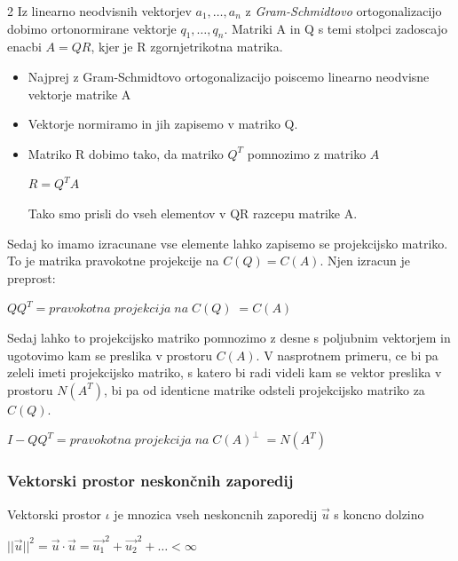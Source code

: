 \documentclass{article}
\begin{document}
\begin{multicols}{2}
	Iz linearno neodvisnih vektorjev $a_{1}, \dots, a_{n}$ z \textit{Gram-Schmidtovo} ortogonalizacijo
	dobimo ortonormirane vektorje $q_{1}, \dots, q_{n}$. Matriki A in Q s temi stolpci zadoscajo enacbi $A = QR$, kjer
	je R zgornjetrikotna matrika.
	\begin{itemize}
		\item Najprej z Gram-Schmidtovo ortogonalizacijo poiscemo linearno neodvisne vektorje matrike A
		\item Vektorje normiramo in jih zapisemo v matriko Q.
		\item Matriko R dobimo tako, da matriko $Q^{T}$ pomnozimo z matriko $A$
		      \begin{center}
			      \begin{math}
				      R = Q^{T}A
			      \end{math}
		      \end{center}
		      Tako smo prisli do vseh elementov v QR razcepu matrike A.
	\end{itemize}
	Sedaj ko imamo izracunane vse elemente lahko zapisemo se projekcijsko matriko. To je matrika pravokotne projekcije na $C(Q) = C(A)$.
	Njen izracun je preprost:
	\begin{center}
		\begin{math}
			QQ^{T} = pravokotna\; projekcija\; na\; C(Q)\; = C(A)
		\end{math}
	\end{center}
	Sedaj lahko to projekcijsko matriko pomnozimo z desne s poljubnim vektorjem in ugotovimo kam se preslika v prostoru $C(A)$.
	V nasprotnem primeru, ce bi pa zeleli imeti projekcijsko matriko, s katero bi radi videli kam se vektor preslika v prostoru $N(A^{T})$, bi pa od identicne matrike
	odsteli projekcijsko matriko za $C(Q)$.
	\begin{center}
		\begin{math}
			I - QQ^{T} = pravokotna\; projekcija\; na\; C(A)^{\perp}\; = N(A^{T})
		\end{math}
	\end{center}

	\subsubsection{Vektorski prostor neskončnih zaporedij}

	Vektorski prostor $\iota$ je mnozica vseh neskoncnih zaporedij $\vec{u}$ s koncno
	dolzino
	\begin{center}
		$||\vec{u}||^{2} = \vec{u} \cdot \vec{u} = \vec{u_{1}}^{2} + \vec{u_{2}}^{2} + \dots < \infty$
	\end{center}


\end{multicols}
\end{document}
